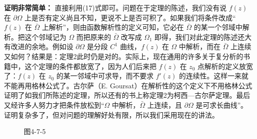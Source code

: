 \noindent\textbf{证明非常简单：}
直接利用(17)式即可。问题在于定理的陈述，我们没有说 $f(z)$ 在 $\partial\Omega$ 上是否有定义尚且不知，更说不上是否可积了。如果我们将条件改成“$f(z)$ 在 $\bar\Omega$ 上解析”，则由函数解析性的定义可知，它必在 $\bar\Omega$ 的某一个邻域中解析。把这个邻域记为 $\Omega$ 而把原来的 $\bar\Omega$ 改写成 $\Omega_1$ 即得，我们对此定理的陈述还大有改进的余地。例如设 $\partial\Omega$ 是分段 $C^1$ 曲线，$f(z)$ 在 $\Omega$ 中解析，而在 $\bar\Omega$ 上连续又如何？结果是：定理2此时仍是对的。实际上，现在通用的许多关于复分析的书籍中，这个定理的条件都放宽了，因为人们后来把 $f(z)$ 在 $z_0$ 点解析的定义放宽了：$f(z)$ 在 $z_0$ 的某一邻域中可求导，而不要求 $f'(z)$ 的连续性。这样一来就不能再用格林公式了。古尔萨（E. Goursat）在解析性的这个定义下不用格林公式证明了如我们所陈述的定理，所以还有的书上称定理2为柯西—古尔萨定理。最后又经许多人努力才把条件放松到“$\Omega$ 中解析，$\bar\Omega$ 上连续，且 $\partial\Omega$ 是可求长曲线”。证明复杂多了，但对问题的理解好处有限，所以我们采用现在的讲法。

\begin{figure}[htbp]
\centering
{}
\caption*{图4-7-5}
\end{figure}

